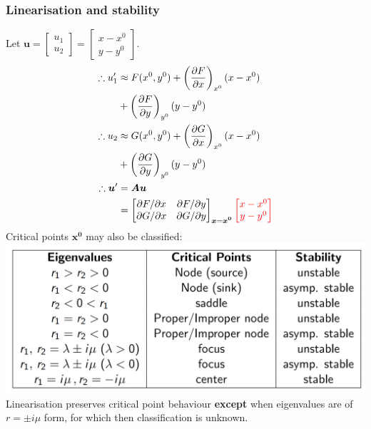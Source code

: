 \documentclass{article}
\begin{document}
\begin{multicols}{3}
\subsubsection*{Linearisation and stability}
Let $\boldsymbol{u}=\begin{bmatrix} u_1 \\ u_2 \end{bmatrix}
=\begin{bmatrix} x-x^0 \\ y-y^0 \end{bmatrix}$.
\begin{align*}
    \therefore u_1'
    &\approx F(x^0, y^0)+\left(\frac{\partial F}{\partial x}\right)_{x^0}(x-x^0) \\
    &+\left(\frac{\partial F}{\partial y}\right)_{y^0}(y-y^0) \\
    \therefore u_2 
    &\approx G(x^0, y^0)+\left(\frac{\partial G}{\partial x}\right)_{x^0}(x-x^0) \\
    &+\left(\frac{\partial G}{\partial y}\right)_{y^0}(y-y^0) \\
    \therefore\boldsymbol{u}' &= \boldsymbol{A}\boldsymbol{u} \\
    &=\begin{bmatrix}
        \partial F/\partial x & \partial F/\partial y \\
        \partial G/\partial x & \partial G/\partial y
    \end{bmatrix}_{\boldsymbol{x} = \boldsymbol{x^0}}
    \textcolor{red}{\begin{bmatrix} x-x^0 \\ y-y^0 \end{bmatrix}}
\end{align*}
Critical points $\boldsymbol{x^0}$ may also be classified: \\
\includegraphics[scale=0.33]{f1.png}
Linearisation preserves critical point behaviour \textbf{except} when eigenvalues are of $r=\pm i\mu$ form,
for which then classification is unknown.


\end{multicols}
\end{document}
